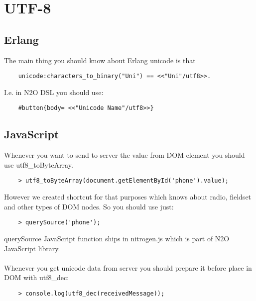 \section{UTF-8}

\subsection{Erlang}

The main thing you should know about Erlang unicode is that

\vspace{1\baselineskip}
\begin{lstlisting}
    unicode:characters_to_binary("Uni") == <<"Uni"/utf8>>.
\end{lstlisting}
\vspace{1\baselineskip}

I.e. in N2O DSL you should use:

\vspace{1\baselineskip}
\begin{lstlisting}
    #button{body= <<"Unicode Name"/utf8>>}
\end{lstlisting}
\vspace{1\baselineskip}

\subsection{JavaScript}

Whenever you want to send to server the value from DOM element
you should use utf8\_toByteArray.

\vspace{1\baselineskip}
\begin{lstlisting}
    > utf8_toByteArray(document.getElementById('phone').value);
\end{lstlisting}
\vspace{1\baselineskip}

However we created shortcut for that purposes which knows
about radio, fieldset and other types of DOM nodes. So you should use just:

\vspace{1\baselineskip}
\begin{lstlisting}
    > querySource('phone');
\end{lstlisting}
\vspace{1\baselineskip}

querySource JavaScript function ships in nitrogen.js which is part
of N2O JavaScript library.

\paragraph{}
Whenever you get unicode data from server you should prepare it before place
in DOM with utf8\_dec:

\vspace{1\baselineskip}
\begin{lstlisting}
    > console.log(utf8_dec(receivedMessage));
\end{lstlisting}
\vspace{1\baselineskip}
